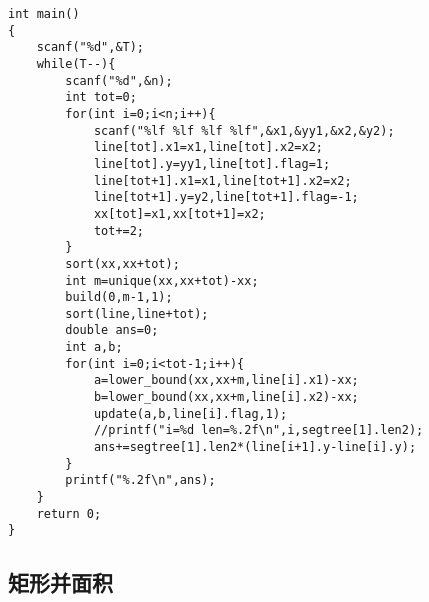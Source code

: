 \begin{lstlisting}
int main()
{
    scanf("%d",&T);
    while(T--){
        scanf("%d",&n);
        int tot=0;
        for(int i=0;i<n;i++){
            scanf("%lf %lf %lf %lf",&x1,&yy1,&x2,&y2);
            line[tot].x1=x1,line[tot].x2=x2;
            line[tot].y=yy1,line[tot].flag=1;
            line[tot+1].x1=x1,line[tot+1].x2=x2;
            line[tot+1].y=y2,line[tot+1].flag=-1;
            xx[tot]=x1,xx[tot+1]=x2;
            tot+=2;
        }
        sort(xx,xx+tot);
        int m=unique(xx,xx+tot)-xx;
        build(0,m-1,1);
        sort(line,line+tot);
        double ans=0;
        int a,b;
        for(int i=0;i<tot-1;i++){
            a=lower_bound(xx,xx+m,line[i].x1)-xx;
            b=lower_bound(xx,xx+m,line[i].x2)-xx;
            update(a,b,line[i].flag,1);
            //printf("i=%d len=%.2f\n",i,segtree[1].len2);
            ans+=segtree[1].len2*(line[i+1].y-line[i].y);
        }
        printf("%.2f\n",ans);
    }
    return 0;
}
\end{lstlisting}

\subsection{矩形并面积}

